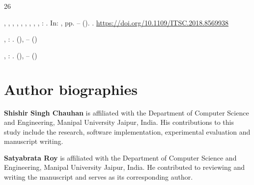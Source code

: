\documentclass[pdflatex,sn-mathphys-num]{sn-jnl}
\providecommand{\burl}[1]{\url{#1}}
\begin{document}
\begin{thebibliography}{26}
\begin{bchapter}
,
,
,
,
,
,
,
,
,
:
.
In: ,
pp. --
().
 .
\burl{https://doi.org/10.1109/ITSC.2018.8569938}
\end{bchapter}
\endbibitem

\begin{barticle}
,
:
.
(),
--
()
\end{barticle}
\endbibitem

\begin{barticle}
,
:
.
(),
--
()
\end{barticle}
\endbibitem

\end{thebibliography}

\clearpage
\section*{Author biographies}
\noindent\textbf{Shishir Singh Chauhan} is affiliated with the Department of Computer Science and Engineering, Manipal University Jaipur, India. His contributions to this study include the research, software implementation, experimental evaluation and manuscript writing.

\noindent\textbf{Satyabrata Roy} is affiliated with the Department of Computer Science and Engineering, Manipal University Jaipur, India. He contributed to reviewing and writing the manuscript and serves as its corresponding author.
\end{document}
